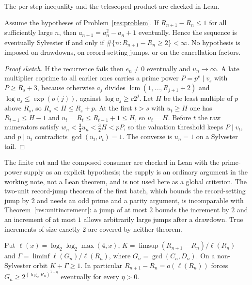 \documentclass[11pt]{article}
\begin{document}
The per-step inequality and the telescoped product are checked in Lean.

\begin{theorem}\label{res:unitincrement}
Assume the hypotheses of Problem~\ref{res:problem}.  If $R_{n+1}-R_n\le1$ for
all sufficiently large $n$, then $a_{n+1}=a_n^2-a_n+1$ eventually.  Hence the
sequence is eventually Sylvester if and only if
$\#\{n:R_{n+1}-R_n\ge2\}<\infty$.  No hypothesis is imposed on drawdowns, on
record-setting jumps, or on the cancellation factors.
\end{theorem}

\begin{proof}[Proof sketch]
If the recurrence fails then $e_n\neq0$ eventually and $u_n\to\infty$.  A late
multiplier coprime to all earlier ones carries a prime power $P=p^e\mid v_s$
with $P\ge R_s+3$, because otherwise $a_j$ divides $\operatorname{lcm}(1,\ldots,R_{j+1}+2)$
and $\log a_j\le\exp(o(j))$, against $\log a_j\ge c2^j$.  Let $H$ be the least
multiple of $p$ above $R_s$, so $R_s<H\le R_s+p$.  At the first $t>s$ with
$u_t\ge H$ one has $R_{t-1}\le H-1$ and $u_t=R_t\le R_{t-1}+1\le H$, so $u_t=H$.
Before $t$ the raw numerators satisfy $w_n<\tfrac32u_n<\tfrac32H<pP$, so the
valuation threshold keeps $P\mid v_t$, and $p\mid u_t$ contradicts
$\gcd(u_t,v_t)=1$.  The converse is $u_n=1$ on a Sylvester tail.
\end{proof}

The finite cut and the composed consumer are checked in Lean with the
prime-power supply as an explicit hypothesis; the supply is an ordinary
argument in the working note, not a Lean theorem, and is not used here as a
global criterion.  The two-unit record-jump theorem of the first batch, which bounds
the record-setting jump by $2$ and needs an odd prime and a parity argument, is
incomparable with Theorem~\ref{res:unitincrement}: a jump of at most $2$ bounds
the increment by $2$ and an increment of at most $1$ allows arbitrarily large
jumps after a drawdown.  True increments of size exactly $2$ are covered by
neither theorem.

\begin{theorem}\label{res:kgamma}
Put $\ell(x)=\log_2\log_2\max(4,x)$, $K=\limsup(R_{n+1}-R_n)/\ell(R_n)$ and
$\Gamma=\liminf\ell(G_n)/\ell(R_n)$, where $G_n=\gcd(C_n,D_n)$.  On a
non-Sylvester orbit $K+\Gamma\ge1$.  In particular
$R_{n+1}-R_n=o(\ell(R_n))$ forces $G_n\ge2^{(\log_2R_n)^{1-\eta}}$ eventually
for every $\eta>0$.
\end{theorem}
\end{document}
